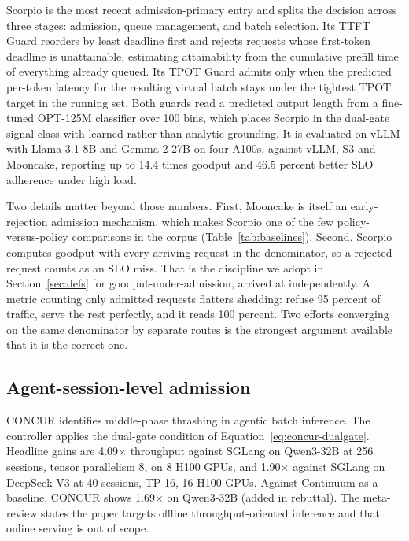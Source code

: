 Scorpio \citep{tang2026scorpio} is the most recent admission-primary entry
and splits the decision across three stages: admission, queue
management, and batch selection. Its TTFT Guard reorders by least
deadline first and rejects requests whose first-token deadline is
unattainable, estimating attainability from the cumulative prefill time
of everything already queued. Its TPOT Guard admits only when the
predicted per-token latency for the resulting virtual batch stays under
the tightest TPOT target in the running set. Both guards read a
predicted output length from a fine-tuned OPT-125M classifier over 100
bins, which places Scorpio in the dual-gate signal class with learned
rather than analytic grounding. It is evaluated on vLLM with
Llama-3.1-8B and Gemma-2-27B on four A100s, against vLLM, S3 and
Mooncake, reporting up to 14.4 times goodput and 46.5 percent better SLO
adherence under high load.

Two details matter beyond those numbers. First, Mooncake is itself an
early-rejection admission mechanism, which makes Scorpio one of the few
policy-versus-policy comparisons in the corpus
(Table~\ref{tab:baselines}). Second, Scorpio computes goodput with every
arriving request in the denominator, so a rejected request counts as an
SLO miss. That is the discipline we adopt in
Section~\ref{sec:defs} for goodput-under-admission, arrived at
independently. A metric counting only admitted requests flatters
shedding: refuse 95 percent of traffic, serve the rest perfectly, and it
reads 100 percent. Two efforts converging on the same denominator by
separate routes is the strongest argument available that it is the
correct one.

\subsection{Agent-session-level admission}

CONCUR \citep{chen2026concur} identifies middle-phase thrashing in
agentic batch inference. The controller applies the dual-gate
condition of Equation~\ref{eq:concur-dualgate}. Headline gains are
4.09$\times$ throughput against SGLang on Qwen3-32B at 256 sessions,
tensor parallelism 8, on 8 H100 GPUs, and 1.90$\times$ against SGLang
on DeepSeek-V3 at 40 sessions, TP 16, 16 H100 GPUs. Against Continuum
as a baseline, CONCUR shows 1.69$\times$ on Qwen3-32B (added in
rebuttal). The meta-review states the paper targets offline
throughput-oriented inference and that online serving is out of scope.

